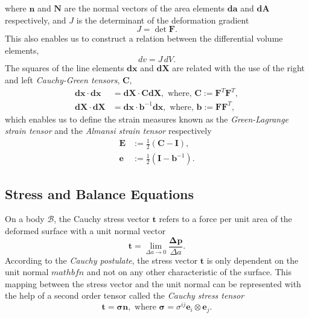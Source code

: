 \documentclass[../main.tex]{subfiles}
\begin{document}
 where $\boldsymbol{n}$ and $\boldsymbol{N}$ are the normal vectors of the area elements $\mathbf{d}\boldsymbol{a}$ and $\mathbf{d}\boldsymbol{A}$ respectively, and $J$ is the determinant of the deformation gradient
 \begin{equation}\label{jacobian_deformation_gradient}
    J = \det\boldsymbol{F}.
 \end{equation}
 This also enables us to construct a relation between the differential volume elements,
 \begin{equation} \label{volume}
    dv = J\,dV.
 \end{equation}
The squares of the line elements $\mathbf{d}\boldsymbol{x}$ and $\mathbf{d}\boldsymbol{X}$ are related with the use of the right and left \emph{Cauchy-Green tensors}, $\boldsymbol{C}$,
\begin{align} \label{cauchy_green_tensors}
    \mathbf{d}\boldsymbol{x} \cdot \mathbf{d}\boldsymbol{x} &= \mathbf{d}\boldsymbol{X} \cdot \boldsymbol{C} \mathbf{d}\boldsymbol{X}, \text{ where, } \boldsymbol{C} := \boldsymbol{F}^{T}\boldsymbol{F}^{T},\\
    \mathbf{d}\boldsymbol{X} \cdot \mathbf{d}\boldsymbol{X} &= \mathbf{d}\boldsymbol{x} \cdot \boldsymbol{b}^{-1} \mathbf{d}\boldsymbol{x}, \text{ where, } \boldsymbol{b} := \boldsymbol{F} \boldsymbol{F}^{T},
\end{align}
which enables us to define the strain measures known as the \emph{Green-Lagrange strain tensor} and the \emph{Almansi strain tensor} respectively
\begin{align} \label{strain_measures}
    \boldsymbol{E} &:= \frac{1}{2} \left(\boldsymbol{C} - \boldsymbol{I}\right),\\
    \boldsymbol{e} &:= \frac{1}{2} \left(\boldsymbol{I} - \boldsymbol{b}^{-1}\right).
\end{align}
\subsection{Stress and Balance Equations}
On a body $\mathcal{B}$, the Cauchy stress vector $\mathbf{t}$ refers to a force per unit area of the deformed surface with a unit normal vector
\begin{equation} \label{traction_vector_definition}
    \mathbf{t} = \lim_{\Delta a \rightarrow 0} \frac{\mathbf{\Delta p}}{\Delta a}. 
\end{equation}
According to the \emph{Cauchy postulate}, the stress vector $\mathbf{t}$ is only dependent on the unit normal $mathbf{n}$ and not on any other characteristic
 of the surface. This mapping between the stress vector and the unit normal can be represented with the help of a second order tensor called the \emph{Cauchy stress tensor}
 \begin{equation} \label{cauchy_stress_tensor}
    \mathbf{t} = \boldsymbol{\sigma} \mathbf{n}, \text{ where } \boldsymbol{\sigma} = \sigma^{ij} \mathbf{e}_{i} \otimes \mathbf{e}_{j}.
 \end{equation}
\end{document}
